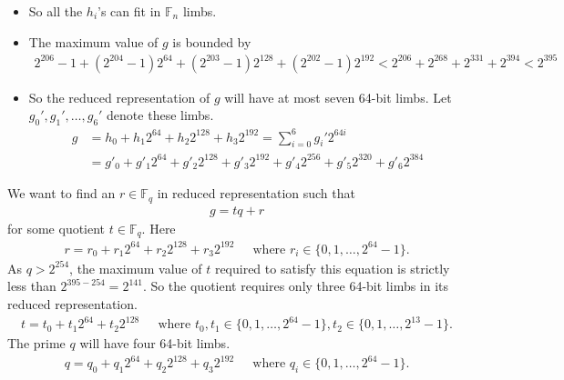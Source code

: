 \documentclass[a4paper, 12pt]{article}
\begin{document}
\begin{itemize}
\begin{itemize}
    \end{itemize}
  \item So all the $h_i$'s can fit in $\mathbb{F}_n$ limbs.
  \item The maximum value of $g$ is bounded by
    \begin{align*}
      2^{206} - 1 + \left(2^{204} - 1\right) 2^{64}+ \left( 2^{203}-1 \right)2^{128}+ \left( 2^{202}-1 \right)2^{192} < 2^{206} + 2^{268} + 2^{331} + 2^{394} < 2^{395}
    \end{align*}
  \item So the reduced representation of $g$ will have at most seven 64-bit limbs. Let $g_0', g_1',\ldots,g_6'$ denote these limbs.
   \begin{align*}
   g & = h_0 + h_1 2^{64} + h_2 2^{128} + h_3 2^{192} = \sum^{6}_{i=0} g_i' 2^{64i}\\
     & = g'_0 + g'_1 2^{64} + g'_2 2^{128} + g'_3 2^{192} + g'_4 2^{256} +   g'_5 2^{320} + g'_6 2^{384}
   \end{align*}
\end{itemize}

We want to find an $r \in \mathbb{F}_q$ in reduced representation such that 
\begin{align}
  g = tq+r
  \label{eqn:g_equals_tq_plus_r}
\end{align}
for some quotient $t \in \mathbb{F}_q$. Here
\begin{align*}
  r = r_0 + r_1 2^{64} + r_2 2^{128} + r_3 2^{192} \ \ \ \ \ \text{ where } r_i \in \{0,1,\ldots,2^{64}-1\}.
\end{align*}
As $q > 2^{254}$, the maximum value of $t$ required to satisfy this equation is strictly less than $2^{395-254} = 2^{141}$. So the quotient requires only three 64-bit limbs in its reduced representation.
\begin{align*}
  t = t_0 + t_1 2^{64} + t_2 2^{128}\ \ \ \ \ \text{ where } t_0, t_1 \in \{0,1,\ldots,2^{64}-1\}, t_2 \in \{0,1,\ldots,2^{13}-1\}.
\end{align*}
The prime $q$ will have four 64-bit limbs.
\begin{align*}
  q = q_0 + q_1 2^{64} + q_2 2^{128} + q_3 2^{192} \ \ \ \ \ \text{ where } q_i \in \{0,1,\ldots,2^{64}-1\}.
\end{align*}
\end{document}
